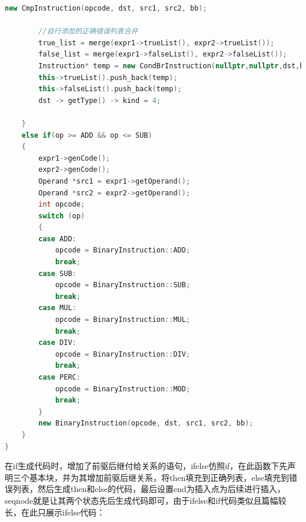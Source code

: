 \documentclass[UTF8,a4paper,10pt]{ctexart}
\begin{document}
\begin{lstlisting}[title = 二元表达式与错误回填, language = c++]
        new CmpInstruction(opcode, dst, src1, src2, bb);

        //自行添加的正确错误列表合并
        true_list = merge(expr1->trueList(), expr2->trueList());
        false_list = merge(expr1->falseList(), expr2->falseList());
        Instruction* temp = new CondBrInstruction(nullptr,nullptr,dst,bb);
        this->trueList().push_back(temp);
        this->falseList().push_back(temp);
        dst -> getType() -> kind = 4;
        
    }
    else if(op >= ADD && op <= SUB)
    {
        expr1->genCode();
        expr2->genCode();
        Operand *src1 = expr1->getOperand();
        Operand *src2 = expr2->getOperand();
        int opcode;
        switch (op)
        {
        case ADD:
            opcode = BinaryInstruction::ADD;
            break;
        case SUB:
            opcode = BinaryInstruction::SUB;
            break;
        case MUL:
            opcode = BinaryInstruction::MUL;
            break;
        case DIV:
            opcode = BinaryInstruction::DIV;
            break;
        case PERC:
            opcode = BinaryInstruction::MOD;
            break;
        }
        new BinaryInstruction(opcode, dst, src1, src2, bb);
    }
}
\end{lstlisting}
在if生成代码时，增加了前驱后继付给关系的语句，ifelse仿照if，在此函数下先声明三个基本块，并为其增加前驱后继关系，将then填充到正确列表，else填充到错误列表，然后生成then和else的代码，最后设置end为插入点为后续进行插入，seqnode就是让其两个状态先后生成代码即可，由于ifelse和if代码类似且篇幅较长，在此只展示ifelse代码：
\end{document}
